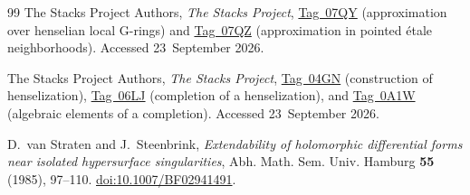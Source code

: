 \begin{thebibliography}{99}
The Stacks Project Authors,
\emph{The Stacks Project},
\href{https://stacks.math.columbia.edu/tag/07QY}{Tag~07QY}
(approximation over henselian local G-rings) and
\href{https://stacks.math.columbia.edu/tag/07QZ}{Tag~07QZ}
(approximation in pointed \'etale neighborhoods).
Accessed 23~September 2026.

The Stacks Project Authors,
\emph{The Stacks Project},
\href{https://stacks.math.columbia.edu/tag/04GN}{Tag~04GN}
(construction of henselization),
\href{https://stacks.math.columbia.edu/tag/06LJ}{Tag~06LJ}
(completion of a henselization), and
\href{https://stacks.math.columbia.edu/tag/0A1W}{Tag~0A1W}
(algebraic elements of a completion).
Accessed 23~September 2026.

D.~van Straten and J.~Steenbrink,
\emph{Extendability of holomorphic differential forms near isolated
hypersurface singularities},
Abh. Math. Sem. Univ. Hamburg \textbf{55} (1985), 97--110.
\href{https://doi.org/10.1007/BF02941491}{doi:10.1007/BF02941491}.

\end{thebibliography}
